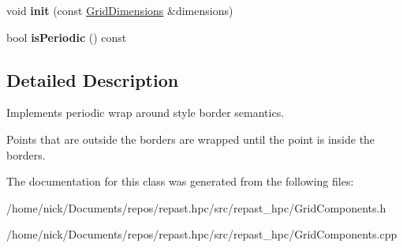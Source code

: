 \begin{DoxyCompactItemize}
\item 
\hypertarget{classrepast_1_1_wrap_around_borders_a68748d5a4e148ee99ebc29e5e0009808}{void {\bfseries init} (const \hyperlink{classrepast_1_1_grid_dimensions}{Grid\-Dimensions} \&dimensions)}\label{classrepast_1_1_wrap_around_borders_a68748d5a4e148ee99ebc29e5e0009808}

\item 
\hypertarget{classrepast_1_1_wrap_around_borders_a69ffcf2cca2df6aac4f751739858345d}{bool {\bfseries is\-Periodic} () const }\label{classrepast_1_1_wrap_around_borders_a69ffcf2cca2df6aac4f751739858345d}

\end{DoxyCompactItemize}


\subsection{Detailed Description}
Implements periodic wrap around style border semantics. 

Points that are outside the borders are wrapped until the point is inside the borders. 

The documentation for this class was generated from the following files\-:\begin{DoxyCompactItemize}
\item 
/home/nick/\-Documents/repos/repast.\-hpc/src/repast\-\_\-hpc/Grid\-Components.\-h\item 
/home/nick/\-Documents/repos/repast.\-hpc/src/repast\-\_\-hpc/Grid\-Components.\-cpp\end{DoxyCompactItemize}
